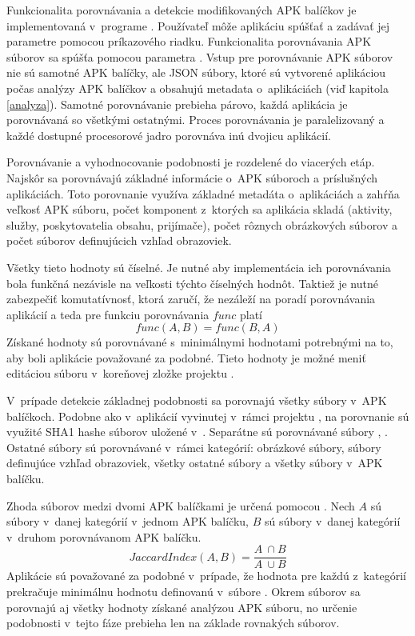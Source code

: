 Funkcionalita porovnávania a detekcie modifikovaných APK balíčkov je implementovaná v~programe . Používateľ môže aplikáciu spúšťať a zadávať jej parametre pomocou príkazového riadku. Funkcionalita porovnávania APK súborov sa spúšťa pomocou parametra . Vstup pre porovnávanie APK súborov nie sú samotné APK balíčky, ale JSON súbory, ktoré sú vytvorené aplikáciou  počas analýzy APK balíčkov a obsahujú metadata o~aplikáciách (viď kapitola \ref{analyza}). Samotné porovnávanie prebieha párovo, každá aplikácia je porovnávaná so všetkými ostatnými. Proces porovnávania je paralelizovaný a každé dostupné procesorové jadro porovnáva inú dvojicu aplikácií. 

Porovnávanie a vyhodnocovanie podobnosti je rozdelené do viacerých etáp. Najskôr sa porovnávajú základné informácie o~APK súboroch a príslušných aplikáciách. Toto porovnanie využíva základné metadáta o~aplikáciách a zahŕňa veľkosť APK súboru, počet komponent z~ktorých sa aplikácia skladá (aktivity, služby, poskytovatelia obsahu, prijímače), počet rôznych obrázkových súborov a počet súborov definujúcich vzhľad obrazoviek.

Všetky tieto hodnoty sú číselné. Je nutné aby implementácia ich porovnávania bola funkčná nezávisle na veľkosti týchto číselných hodnôt. Taktiež je nutné zabezpečiť komutatívnosť, ktorá zaručí, že nezáleží na poradí porovnávania aplikácií a teda pre funkciu porovnávania $func$ platí \[func(A,B) = func(B,A)\] Získané hodnoty sú porovnávané s~minimálnymi hodnotami potrebnými na to, aby boli aplikácie považované za podobné. Tieto hodnoty je možné meniť editáciou súboru  v~koreňovej zložke projektu .

V~prípade detekcie základnej podobnosti sa porovnajú všetky súbory v~APK balíčkoch. Podobne ako v~aplikácií vyvinutej v~rámci projektu , na porovnanie sú využité SHA1 hashe súborov uložené v~. Separátne sú porovnávané súbory , . Ostatné súbory sú porovnávané v~rámci kategórií: obrázkové súbory, súbory definujúce vzhľad obrazoviek, všetky ostatné súbory a všetky súbory v~APK balíčku. 

Zhoda súborov medzi dvomi APK balíčkami je určená pomocou . Nech $A$ sú súbory v~danej kategórií v~jednom APK balíčku, $B$ sú súbory v~danej kategórií v~druhom porovnávanom APK balíčku. \[Jaccard Index(A,B) = \frac{A~\cap B}{ A~\cup B}\] Aplikácie sú považované za podobné v~prípade, že hodnota  pre každú z~kategórií prekračuje minimálnu hodnotu definovanú v~súbore . Okrem súborov sa porovnajú aj všetky hodnoty získané analýzou APK súboru, no určenie podobnosti v~tejto fáze prebieha len na základe rovnakých súborov. 

